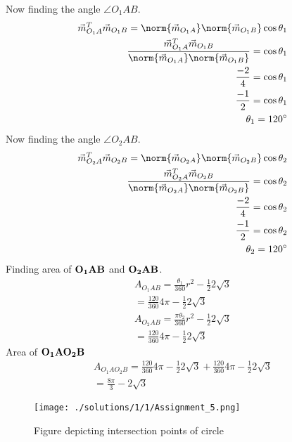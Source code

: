 Now finding the angle $\angle{O_1AB}$.
\begin{align}
    \vec{m}_{O_1A}^T \vec{m}_{O_1B}=\norm{ \vec{m}_{O_1A}}\norm{\vec{m}_{O_1B}}\cos\theta_1\\
    \frac{\vec{m}_{O_1A}^T \vec{m}_{O_1B}}{\norm{ \vec{m}_{O_1A}}\norm{\vec{m}_{O_1B}}}
    =\cos\theta_1\\
     \frac{-2}{4}=\cos\theta_1\\
    \frac{-1}{2}=\cos\theta_1\\
    \theta_1=120^{\circ}
\end{align}
Now finding the angle $\angle{O_2AB}$.
\begin{align}
   \vec{m}_{O_2A}^T \vec{m}_{O_2B}=\norm{ \vec{m}_{O_2A}}\norm{\vec{m}_{O_2B}}\cos\theta_2\\
    \frac{\vec{m}_{O_2A}^T \vec{m}_{O_2B}}{\norm{ \vec{m}_{O_2A}}\norm{\vec{m}_{O_2B}}}
    =\cos\theta_2\\
     \frac{-2}{4}=\cos\theta_2\\
    \frac{-1}{2}=\cos\theta_2\\
    \theta_2=120^{\circ}
\end{align}
Finding area of $\bf{O_1AB}$ and $\bf{O_2AB}$.
 \begin{align}
A_{O_1AB}=\frac{\theta_1}{360}r^2-\frac{1}{2}2\sqrt{3}\\
=\frac{120}{360}4\pi-\frac{1}{2}2\sqrt{3}\\
A_{O_2AB}=\frac{\pi\theta_2}{360}r^2-\frac{1}{2}2\sqrt{3}\\
=\frac{120}{360}4\pi-\frac{1}{2}2\sqrt{3}
\end{align}
Area of  $\bf{O_1AO_2B}$
\begin{align}
A_{O_1AO_2B}=\frac{120}{360}4\pi-\frac{1}{2}2\sqrt{3}+\frac{120}{360}4\pi-\frac{1}{2}2\sqrt{3}\\
=\frac{8\pi}{3}-2\sqrt{3}
\end{align}
  \begin{figure}[h!]
	\centering
	\texttt{[image: ./solutions/1/1/Assignment\_5.png]}
	\caption{Figure depicting intersection points of circle}
	\label{eq:solutions/1/myfig:solutions/1/}
\end{figure}
 
